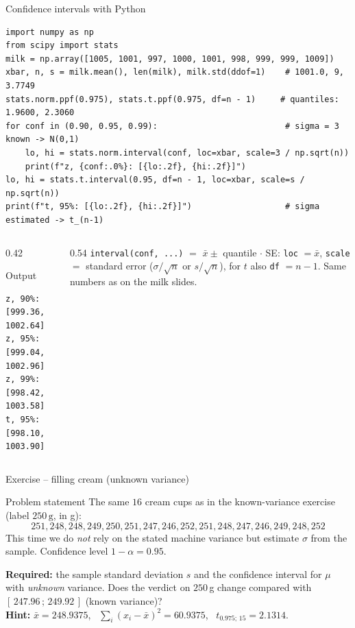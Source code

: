\documentclass[aspectratio=169,11pt]{beamer}
\begin{document}
\begin{frame}[fragile]{Confidence intervals with Python}
  \lstset{aboveskip=2pt,belowskip=2pt}
\begin{lstlisting}
import numpy as np
from scipy import stats
milk = np.array([1005, 1001, 997, 1000, 1001, 998, 999, 999, 1009])
xbar, n, s = milk.mean(), len(milk), milk.std(ddof=1)    # 1001.0, 9, 3.7749
stats.norm.ppf(0.975), stats.t.ppf(0.975, df=n - 1)     # quantiles: 1.9600, 2.3060
for conf in (0.90, 0.95, 0.99):                          # sigma = 3 known -> N(0,1)
    lo, hi = stats.norm.interval(conf, loc=xbar, scale=3 / np.sqrt(n))
    print(f"z, {conf:.0%}: [{lo:.2f}, {hi:.2f}]")
lo, hi = stats.t.interval(0.95, df=n - 1, loc=xbar, scale=s / np.sqrt(n))
print(f"t, 95%: [{lo:.2f}, {hi:.2f}]")                   # sigma estimated -> t_(n-1)
\end{lstlisting}
  \begin{columns}[T]
    \begin{column}{0.42\textwidth}
      \begin{block}{Output}
\begin{lstlisting}[style=Pyout,aboveskip=0pt,belowskip=0pt]
z, 90%: [999.36, 1002.64]
z, 95%: [999.04, 1002.96]
z, 99%: [998.42, 1003.58]
t, 95%: [998.10, 1003.90]
\end{lstlisting}
      \end{block}
    \end{column}
    \begin{column}{0.54\textwidth}
      \footnotesize \texttt{interval(conf, ...)} $=$ $\bar x\pm$ quantile
      $\cdot$ SE: \texttt{loc} $=\bar x$, \texttt{scale} $=$ standard error
      ($\sigma/\sqrt n$ or $s/\sqrt n$), for $t$ also \texttt{df} $=n-1$.
      Same numbers as on the milk slides.
    \end{column}
  \end{columns}
\end{frame}

\begin{frame}{Exercise -- filling cream (unknown variance)}
  \begin{block}{Problem statement}
    The same $16$ cream cups as in the known-variance exercise (label
    $250\,\text{g}$, in g):
    \[
      251,248,248,249,250,251,247,246,252,251,248,247,246,249,248,252
    \]
    This time we do \emph{not} rely on the stated machine variance but
    estimate $\sigma$ from the sample. Confidence level $1-\alpha=0.95$.
  \end{block}
  \textbf{Required:} the sample standard deviation $s$ and the confidence
  interval for $\mu$ with \emph{unknown} variance. Does the verdict on
  $250$\,g change compared with $[\,247.96\,;\,249.92\,]$ (known variance)?\\[2pt]
  \textbf{Hint:} $\bar x=248.9375$, \
  $\sum_{i}(x_i-\bar x)^2=60.9375$, \ $t_{0.975;\,15}=2.1314$.
\end{frame}
\end{document}
